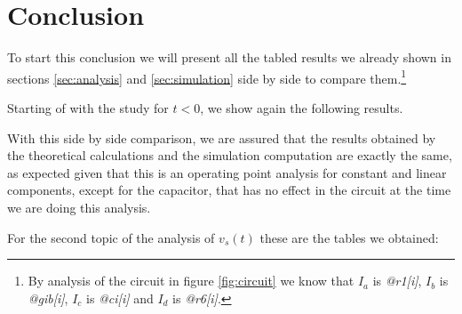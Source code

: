 \newpage
\section{Conclusion}
\label{sec:conclusion}
To start this conclusion we will present all the tabled results we already shown in sections \ref{sec:analysis} and \ref{sec:simulation} side by side to compare them.\footnote{By analysis of the circuit in figure \ref{fig:circuit} we know that $I_a$ is \textit{@r1[i]}, $I_b$ is \textit{@gib[i]}, $I_c$ is \textit{@ci[i]} and $I_d$ is \textit{@r6[i]}.}

Starting of with the study for $t<0$, we show again the following results.
\FloatBarrier
\begin{table}[h]
	\centering
	\qquad
	\caption{Operating point analysis for $t<0$}
	\label{tab:conc1}
\end{table}
\FloatBarrier

With this side by side comparison, we are assured that the results obtained by the theoretical calculations and the simulation computation are exactly the same, as expected given that this is an operating point analysis for constant and linear components, except for the capacitor, that has no effect in the circuit at the time we are doing this analysis.  
\vspace{0.5cm}

For the second topic of the analysis of $v_s(t)$ these are the tables we obtained:

\FloatBarrier
\begin{table}[h]
	\centering
	\qquad
	\caption{Operating point analysis for $v_s=0$}
	\label{tab:conc2}
\end{table}
\FloatBarrier

